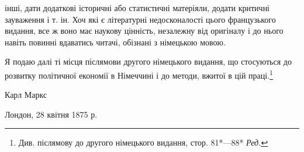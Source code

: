інші, дати додаткові історичні або статистичні матеріяли, додати
критичні зауваження і т. ін. Хоч які є літературні недосконалості
цього французького видання, все ж воно має наукову цінність,
незалежну від оригіналу і до нього навіть повинні вдаватись
читачі, обізнані з німецькою мовою.

Я подаю далі ті місця післямови другого німецького видання,
що стосуються до розвитку політичної економії в Німеччині і до
методи, вжитої в цій праці.\footnote*{
Див. післямову до другого німецького видання, стор. 81*—88* \emph{Ред.}
}

Карл Маркс

Лондон, 28 квітня 1875 р.
